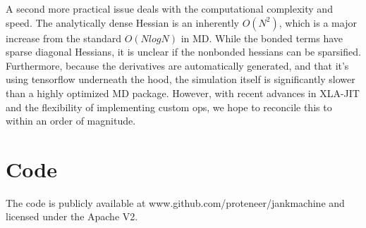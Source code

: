 \documentclass{article}
\begin{document}
A second more practical issue deals with the computational complexity and speed. The analytically dense Hessian is an inherently $O(N^2)$, which is a major increase from the standard $O(N log N)$ in MD. While the bonded terms have sparse diagonal Hessians, it is unclear if the nonbonded hessians can be sparsified. Furthermore, because the derivatives are automatically generated, and that it's using tensorflow underneath the hood, the simulation itself is significantly slower than a highly optimized MD package. However, with recent advances in XLA-JIT and the flexibility of implementing custom ops, we hope to reconcile this to within an order of magnitude.

\section{Code}

The code is publicly available at www.github.com/proteneer/jankmachine and licensed under the Apache V2.
\end{document}
